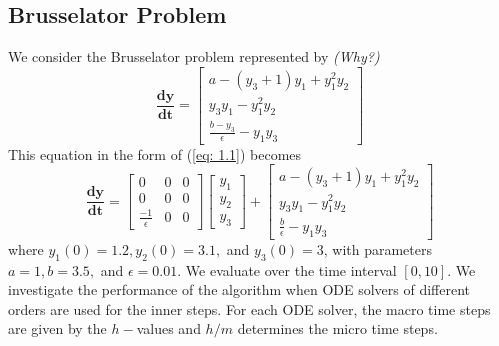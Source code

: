 \documentclass[12pt]{article}
\begin{document}
\subsection{Brusselator Problem}
We consider the Brusselator problem represented by  \emph{(Why?)}
\begin{equation}
\mathbf{\frac{dy}{dt}} = \begin{bmatrix}
a - (y_3 + 1)y_1 + y_1^2y_2\\ y_3y_1 - y_1^2y_2\\ \frac{b-y_3}{\epsilon} - y_1y_3
\end{bmatrix}
\end{equation}
This equation in the form of (\ref{eq: 1.1}) becomes
\begin{equation}
\mathbf{\frac{dy}{dt}} = \begin{bmatrix}
0 & 0 & 0 \\ 0 & 0 & 0 \\ \frac{-1}{\epsilon} & 0 & 0
\end{bmatrix} \begin{bmatrix}
y_1 \\ y_2 \\ y_3
\end{bmatrix}  + \begin{bmatrix}
a - (y_3 + 1)y_1 + y_1^2y_2\\ y_3y_1 - y_1^2y_2\\ \frac{b}{\epsilon} - y_1y_3
\end{bmatrix}
\end{equation}
where $y_1(0) = 1.2, y_2(0) = 3.1,$ and $y_3(0) = 3$, with parameters $a=1, b=3.5,$ and $\epsilon =0.01$.  We evaluate over the time interval $[0,10]$. We investigate the performance of the algorithm when ODE solvers of different orders are used for the inner steps. For each ODE solver, the macro time steps are given by the $h-$values and $h/m$ determines the micro time steps.\\

\end{document}
